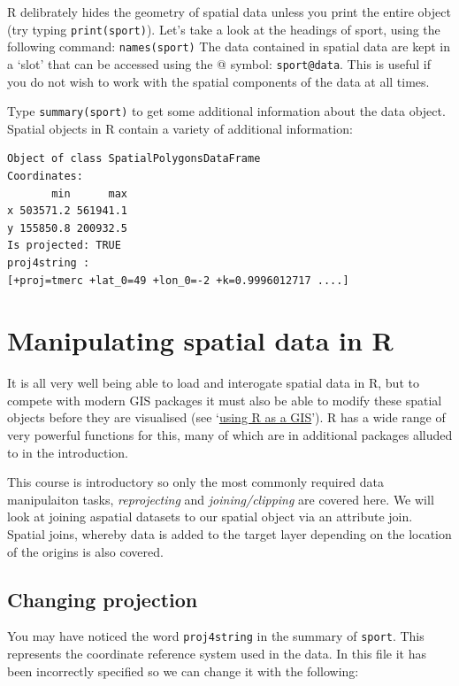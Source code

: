 \documentclass[]{article}
\begin{document}
R delibrately hides the geometry of spatial data unless you print the
entire object (try typing \texttt{print(sport)}). Let's take a look at
the headings of sport, using the following command:
\texttt{names(sport)} The data contained in spatial data are kept in a
`slot' that can be accessed using the @ symbol: \texttt{sport@data}.
This is useful if you do not wish to work with the spatial components of
the data at all times.

Type \texttt{summary(sport)} to get some additional information about
the data object. Spatial objects in R contain a variety of additional
information:

\begin{verbatim}
Object of class SpatialPolygonsDataFrame
Coordinates:
       min      max
x 503571.2 561941.1
y 155850.8 200932.5
Is projected: TRUE 
proj4string :
[+proj=tmerc +lat_0=49 +lon_0=-2 +k=0.9996012717 ....]
\end{verbatim}
\section{Manipulating spatial data in R}

It is all very well being able to load and interogate spatial data in R,
but to compete with modern GIS packages it must also be able to modify
these spatial objects before they are visualised (see
`\href{https://github.com/Pakillo/R-GIS-tutorial}{using R as a GIS}'). R
has a wide range of very powerful functions for this, many of which are
in additional packages alluded to in the introduction.

This course is introductory so only the most commonly required data
manipulaiton tasks, \emph{reprojecting} and \emph{joining/clipping} are
covered here. We will look at joining aspatial datasets to our spatial
object via an attribute join. Spatial joins, whereby data is added to
the target layer depending on the location of the origins is also
covered.

\subsection{Changing projection}

You may have noticed the word \texttt{proj4string} in the summary of
\texttt{sport}. This represents the coordinate reference system used in
the data. In this file it has been incorrectly specified so we can
change it with the following:
\end{document}
